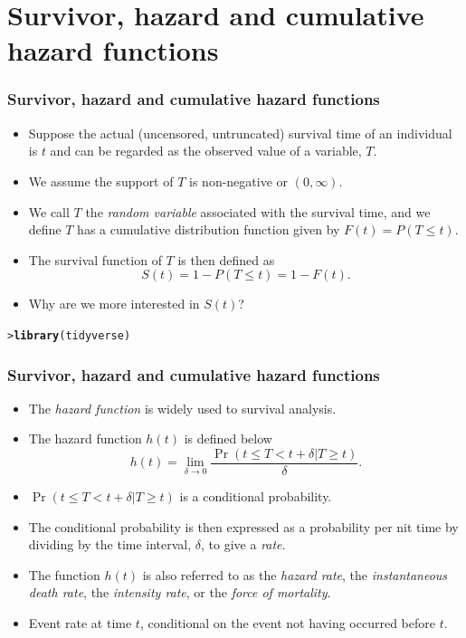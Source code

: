 \documentclass[10pt]{beamer}\usepackage[]{graphicx}\usepackage[]{color}
\makeatletter
\newcommand{\hlstd}[1]{\textcolor[rgb]{0.345,0.345,0.345}{#1}}%
\newcommand{\hlkwd}[1]{\textcolor[rgb]{0.737,0.353,0.396}{\textbf{#1}}}%
\newenvironment{kframe}{%
 \def\at@end@of@kframe{}%
 \ifinner\ifhmode%
  \def\at@end@of@kframe{\end{minipage}}%
  \begin{minipage}{\columnwidth}%
 \fi\fi%
 \def\FrameCommand##1{\hskip\@totalleftmargin \hskip-\fboxsep
 \colorbox{shadecolor}{##1}\hskip-\fboxsep
     \hskip-\linewidth \hskip-\@totalleftmargin \hskip\columnwidth}%
 \MakeFramed {\advance\hsize-\width
   \@totalleftmargin\z@ \linewidth\hsize
   \@setminipage}}%
 {\par\unskip\endMakeFramed%
 \at@end@of@kframe}
\newenvironment{knitrout}{}{} %
\renewenvironment{knitrout}{\setlength{\topsep}{-.2mm}}{}
\newcommand{\empr}[1]{{\emph{\color{red}#1}}}
\makeatother
\begin{document}
\section{Survivor, hazard and cumulative hazard functions}
\begin{frame}[fragile]
  \frametitle{Survivor, hazard and cumulative hazard functions}
  \begin{itemize}
  \item Suppose the actual (uncensored, untruncated) survival time of an individual is $t$
    and can be regarded as the observed value of a variable, $T$.
  \item We assume the support of $T$ is non-negative or $(0, \infty)$.
  \item We call $T$ the \emph{random variable} associated with the survival time, 
    and we define $T$ has a cumulative distribution function given by
    $F(t) = P(T \le t)$.
  \item The survival function of $T$ is then defined as $$S(t) = 1 - P(T\le t) = 1 - F(t).$$
  \item Why are we more interested in $S(t)$?
  \end{itemize}
\begin{knitrout}\scriptsize
{}\color{fgcolor}\begin{kframe}
\begin{alltt}
\hlstd{> }\hlkwd{library}\hlstd{(tidyverse)}
\end{alltt}
\end{kframe}
\end{knitrout}

\end{frame}

\begin{frame}
  \frametitle{Survivor, hazard and cumulative hazard functions}
  \begin{itemize}
    \item The \empr{hazard function} is widely used to survival analysis. 
    \item The hazard function $h(t)$ is defined below
      \begin{equation}
        h(t) = \lim_{\delta\to0}\frac{\Pr(t\le T < t + \delta|T\ge t)}{\delta}.
        \label{eq:haz}
      \end{equation}
    \item $\Pr(t\le T< t + \delta|T\ge t)$ is a conditional probability.
    \item The conditional probability is then expressed as a probability per nit time by dividing by the time interval, $\delta$, to give a \emph{rate}.
    \item The function $h(t)$ is also referred to as the \empr{hazard rate}, the \empr{instantaneous death rate}, 
      the \empr{intensity rate}, or the \empr{force of mortality}.
    \item Event rate at time $t$, conditional on the event not having occurred before $t$.
    \end{itemize}
\end{frame}
\end{document}
